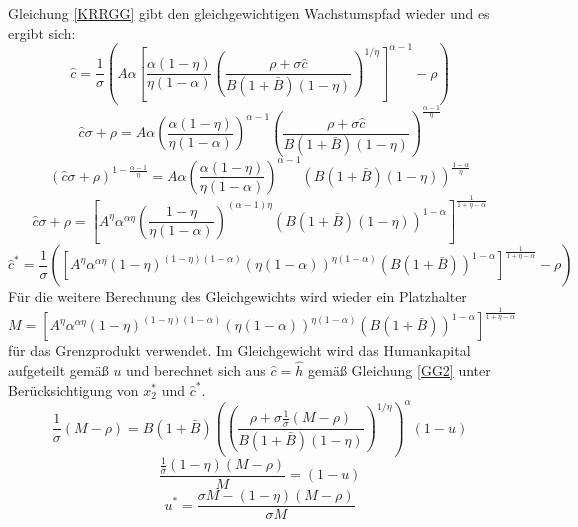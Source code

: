 Gleichung \eqref{KRRGG} gibt den gleichgewichtigen Wachstumspfad wieder und es ergibt sich: 
\begin{equation}
\hat{c}=\frac{1}{\sigma}\left(A\alpha \left[\frac{\alpha(1-\eta)}{\eta(1-\alpha)}\left(\frac{\rho+\sigma\hat{c}}{B(1+\bar{B})(1-\eta)}\right)^{1/\eta}\right]^{\alpha-1}-\rho\right)
\end{equation}
\begin{equation*}
\hat{c}\sigma+\rho=A\alpha\left(\frac{\alpha(1-\eta)}{\eta(1-\alpha)}\right)^{\alpha-1}\left(\frac{\rho+\sigma\hat{c}}{B(1+\bar{B})(1-\eta)}\right)^{\frac{\alpha-1}{\eta}}
\end{equation*}
\begin{equation*}
(\hat{c}\sigma+\rho)^{1-\frac{\alpha-1}{\eta}}=A\alpha\left(\frac{\alpha(1-\eta)}{\eta(1-\alpha)}\right)^{\alpha-1}\left(B(1+\bar{B})(1-\eta)\right)^{\frac{1-\alpha}{\eta}}
\end{equation*}
\begin{equation*}
\hat{c}\sigma+\rho=\left[A^\eta\alpha^{\alpha\eta}\left(\frac{1-\eta}{\eta(1-\alpha)}\right)^{(\alpha-1)\eta}\left(B(1+\bar{B})(1-\eta)\right)^{1-\alpha}\right]^\frac{1}{1+\eta-\alpha}
\end{equation*}
\begin{equation}
\boxed{\hat{c}^*=\frac{1}{\sigma}\left(\left[A^\eta\alpha^{\alpha\eta}(1-\eta)^{(1-\eta)(1-\alpha)}(\eta(1-\alpha))^{\eta(1-\alpha)}(B(1+\bar{B}))^{1-\alpha}\right]^\frac{1}{1+\eta-\alpha}-\rho\right)}
\end{equation}
Für die weitere Berechnung des Gleichgewichts wird wieder ein Platzhalter\\ $M=\left[A^\eta\alpha^{\alpha\eta}(1-\eta)^{(1-\eta)(1-\alpha)}(\eta(1-\alpha))^{\eta(1-\alpha)}(B(1+\bar{B}))^{1-\alpha}\right]^\frac{1}{1+\eta-\alpha}$ für das Grenzprodukt verwendet.
Im Gleichgewicht wird das Humankapital aufgeteilt gemä{\ss} $u$ und berechnet sich aus $\hat{c}=\hat{h}$ gemä{\ss} Gleichung \eqref{GG2} unter Berücksichtigung von $x_2^*$ und $\hat{c}^*$. 
\begin{equation}
\frac{1}{\sigma} (M-\rho)=B(1+\bar{B})\left(\left(\frac{\rho+\sigma\frac{1}{\sigma}(M-\rho)}{B(1+\bar{B})(1-\eta)}\right)^{1/\eta}\right)^\alpha(1-u)
\end{equation}
\begin{equation*}
\frac{\frac{1}{\sigma}(1-\eta)(M-\rho)}{M}=(1-u)
\end{equation*}
\begin{equation}
\boxed{u^*=\frac{\sigma M-(1-\eta)(M-\rho)}{\sigma M}}
\end{equation}
